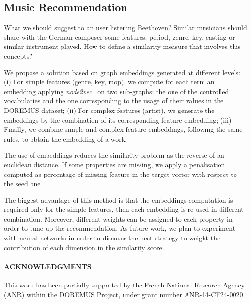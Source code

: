 \subsection{Music Recommendation}
What we should suggest to an user listening Beethoven? Similar musicians should share with the German composer some features: period, genre, key, casting or similar instrument played. How to define a similarity measure that involves this concepts?

We propose a solution based on graph embeddings generated at different levels:
(i) For simple features (genre, key, mop), we compute for each term an embedding applying \textit{node2vec}~\cite{node2vec-kdd2016} on two sub-graphs: the one of the controlled vocabularies and the one corresponding to the usage of their values in the DOREMUS dataset;
(ii) For complex features (artist), we generate the embeddings by the combination of its corresponding feature embedding;
(iii) Finally, we combine simple and complex feature embeddings, following the same rules, to obtain the embedding of a work.

The use of embeddings reduces the similarity problem as the reverse of an euclidean distance. If some properties are missing, we apply a penalisation computed as percentage of missing feature in the target vector with respect to the seed one~\cite{lisena2017combining}.

The biggest advantage of this method is that the embeddings computation is required only for the simple features, then each embedding is re-used in different combination. Moreover, different weights can be assigned to each property in order to tune up the recommendation. As future work, we plan to experiment with neural networks in order to discover the best strategy to weight the contribution of each dimension in the similarity score. 

\paragraph{\textbf{ACKNOWLEDGMENTS}} This work has been partially supported by the French National Research Agency (ANR) within the DOREMUS Project, under grant number ANR-14-CE24-0020.
